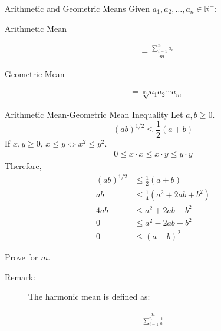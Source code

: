 \documentclass[8pt]{extarticle}
\newcommand{\R}{\mathbb{R}}
\begin{document}
  \begin{problem}{Arithmetic and Geometric Means}
    Given $a_1,a_2,\dots,a_n\in \R^+$:
    \begin{description}
      \item[Arithmetic Mean]
    \end{description}
    \begin{align*}
      &= \frac{\sum_{i =1}^{n} a_i}{m}
    \end{align*}
    \begin{description}
      \item[Geometric Mean]
    \end{description}
    \begin{align*}
      &= \sqrt[m]{a_1a_2\cdots a_m}
    \end{align*}
    \begin{problem}{Arithmetic Mean-Geometric Mean Inequality}
      Let $a,b \geq 0$.
      \[
        (ab)^{1/2} \leq \frac{1}{2}(a+b)
      \] 
      \tcblower
      If $x,y \geq 0$, $x\leq y \Leftrightarrow x^2 \leq y^2$.
      \begin{align*}
          0 \leq x\cdot x \leq x \cdot y \leq y\cdot y\tag*{by property (ii) of ordered fields}
      \end{align*}
      Therefore,  
      \begin{align*}
        (ab)^{1/2}&\leq \frac{1}{2}(a+b)\\
        ab &\leq \frac{1}{4}(a^2 + 2ab + b^2)\\
        4ab &\leq a^2 + 2ab + b^2 \\
        0 &\leq a^2 - 2ab + b^2\\
        0 &\leq (a-b)^2 \tag*{by definition}
      \end{align*}
      \begin{description}
        \small
        \item[Challenge:] Prove for $m$.
      \end{description}
    \end{problem}
    \begin{description}
      \item[Remark:] The harmonic mean is defined as:
    \end{description}
    \begin{align*}
      \frac{n}{\displaystyle\sum_{i=1}^{n}\frac{1}{a_i}}
    \end{align*}
  \end{problem}
\end{document}
